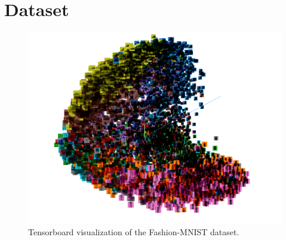 \documentclass[conference]{IEEEtran}
\begin{document}
\section{Dataset}

\begin{figure}[h!]
\centering
  \includegraphics[scale=.15]{tensorboard_pca.png}
  \caption{Tensorboard visualization of the Fashion-MNIST dataset.}
  \label{fig:tensorboard_pca}
\end{figure}
\end{document}
